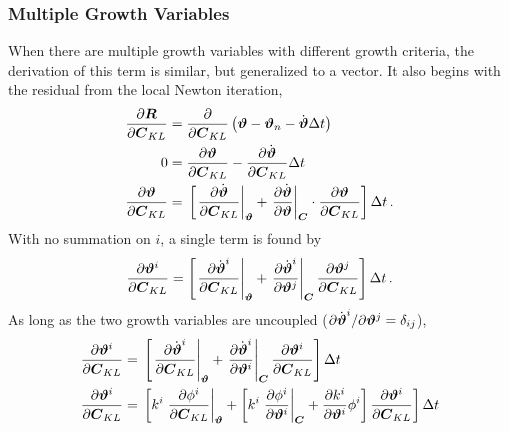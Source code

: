 \documentclass[10pt,letterpaper,oneside]{report}
\newcommand{\ten}[1]{\mbox{\boldmath $#1$}{}}
\newcommand{\tens}[1]{\mbox{\boldmath{\scriptsize{$#1$}}}{}}
\begin{document}
\begin{itemize}
\subsubsection{Multiple Growth Variables}
When there are multiple growth variables with different growth criteria, the derivation of this term is similar, but generalized to a vector.  It also begins with the residual from the local Newton iteration,   
\begin{align}
\frac{\partial \ten{R} }{\partial \ten{C}_{KL} } 
={}& \frac{\partial }{\partial \ten{C}_{KL} } \left( \ten{\vartheta} - \ten{\vartheta}_n - \dot{\ten{\vartheta}} \Delta t \right) 
\notag \\
0 
={}& \frac{\partial \ten{\vartheta} }{\partial \ten{C}_{KL} } - \frac{\partial \dot{\ten{\vartheta}} }{\partial \ten{C}_{KL} } \Delta t 
\notag \\
\frac{\partial \ten{\vartheta} }{\partial \ten{C}_{KL} } 
={}& \left[ \left. \frac{\partial \dot{\ten{\vartheta}} }{\partial \ten{C}_{KL} } \right|_{\tens{\vartheta}} + \left. \frac{\partial \dot{\ten{\vartheta}}}{\partial \ten{\vartheta}} \right|_{\tens{C}} \cdot \frac{\partial \ten{\vartheta} }{\partial \ten{C}_{KL} } \right] \Delta t \, .
\notag 
\end{align}
With no summation on $i$, a single term is found by
\begin{equation*}
\frac{\partial \ten{\vartheta}^i }{\partial \ten{C}_{KL} } = \left[ \left. \frac{\partial \dot{\ten{\vartheta}}^i }{\partial \ten{C}_{KL} } \right|_{\tens{\vartheta} } + \left. \frac{\partial \dot{\ten{\vartheta}}^i}{\partial \ten{\vartheta}^j} \right|_{\tens{C}} \frac{\partial \ten{\vartheta}^j }{\partial \ten{C}_{KL} } \right] \Delta t \, . 
\notag 
\end{equation*}
As long as the two growth variables are uncoupled ($\partial \dot{\ten{\vartheta}}^i / \partial \ten{\vartheta}^j = \delta_{ij}$),
\begin{align}
\frac{\partial \ten{\vartheta}^i }{\partial \ten{C}_{KL} } 
={}& \left[ \left. \frac{\partial \dot{\ten{\vartheta}}^i }{\partial \ten{C}_{KL} } \right|_{\tens{\vartheta} } + \left. \frac{\partial \dot{\ten{\vartheta}}^i}{\partial \ten{\vartheta}^i} \right|_{\tens{C}} \frac{\partial \ten{\vartheta}^i }{\partial \ten{C}_{KL} } \right] \Delta t 
\notag \\
\frac{\partial \ten{\vartheta}^i }{\partial \ten{C}_{KL} } 
={}& \left[ k^i \left. \frac{\partial \phi^i }{\partial \ten{C}_{KL} } \right|_{\tens{\vartheta} } + \left[ k^i \left. \frac{\partial \phi^i }{\partial \ten{\vartheta}^i} \right|_{\tens{C}} + \frac{\partial k^i }{\partial \ten{\vartheta}^i} \phi^i \right] \frac{\partial \ten{\vartheta}^i }{\partial \ten{C}_{KL} } \right] \Delta t 

\end{align}
\end{itemize}
\end{document}
